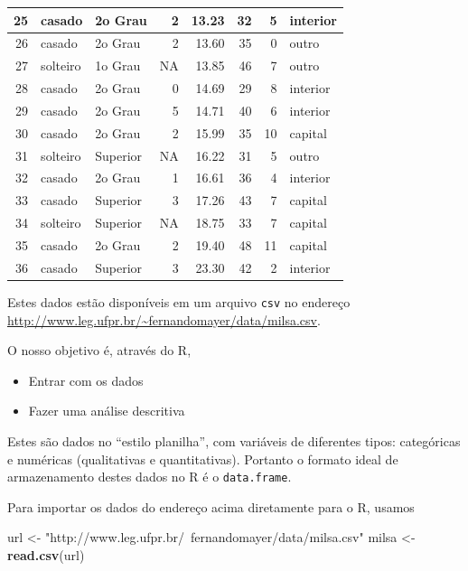 \documentclass[10pt,a4paper]{book}
\newenvironment{Shaded}{\begin{snugshade}}{\end{snugshade}}
\newcommand{\KeywordTok}[1]{\textcolor[rgb]{0.13,0.29,0.53}{\textbf{#1}}}
\newcommand{\StringTok}[1]{\textcolor[rgb]{0.31,0.60,0.02}{#1}}
\newcommand{\NormalTok}[1]{#1}
\providecommand{\tightlist}{%
  \setlength{\itemsep}{0pt}\setlength{\parskip}{0pt}}
\begin{document}
\begin{tabular}{r|l|l|r|r|r|r|l}
\hline
25 & casado & 2o Grau & 2 & 13.23 & 32 & 5 & interior\\
\hline
26 & casado & 2o Grau & 2 & 13.60 & 35 & 0 & outro\\
\hline
27 & solteiro & 1o Grau & NA & 13.85 & 46 & 7 & outro\\
\hline
28 & casado & 2o Grau & 0 & 14.69 & 29 & 8 & interior\\
\hline
29 & casado & 2o Grau & 5 & 14.71 & 40 & 6 & interior\\
\hline
30 & casado & 2o Grau & 2 & 15.99 & 35 & 10 & capital\\
\hline
31 & solteiro & Superior & NA & 16.22 & 31 & 5 & outro\\
\hline
32 & casado & 2o Grau & 1 & 16.61 & 36 & 4 & interior\\
\hline
33 & casado & Superior & 3 & 17.26 & 43 & 7 & capital\\
\hline
34 & solteiro & Superior & NA & 18.75 & 33 & 7 & capital\\
\hline
35 & casado & 2o Grau & 2 & 19.40 & 48 & 11 & capital\\
\hline
36 & casado & Superior & 3 & 23.30 & 42 & 2 & interior\\
\hline
\end{tabular}

Estes dados estão disponíveis em um arquivo \texttt{csv} no endereço
\url{http://www.leg.ufpr.br/~fernandomayer/data/milsa.csv}.

O nosso objetivo é, através do R,

\begin{itemize}
\tightlist
\item
  Entrar com os dados
\item
  Fazer uma análise descritiva
\end{itemize}

Estes são dados no ``estilo planilha'', com variáveis de diferentes
tipos: categóricas e numéricas (qualitativas e quantitativas). Portanto
o formato ideal de armazenamento destes dados no R é o
\texttt{data.frame}.

Para importar os dados do endereço acima diretamente para o R, usamos

\begin{Shaded}
\begin{Highlighting}[]
\NormalTok{url <-}\StringTok{ "http://www.leg.ufpr.br/~fernandomayer/data/milsa.csv"}
\NormalTok{milsa <-}\StringTok{ }\KeywordTok{read.csv}\NormalTok{(url)}
\end{Highlighting}
\end{Shaded}
\end{document}
